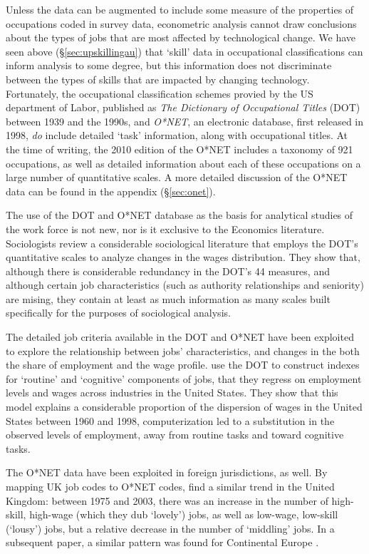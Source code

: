 Unless the data can be augmented to include some measure of the properties of occupations coded in survey data, econometric analysis cannot draw conclusions about the types of jobs that are most affected by technological change. We have seen above (\S\ref{sec:upskillingau}) that `skill' data in occupational classifications can inform analysis to some degree, but this information does not discriminate between the types of skills that are impacted by changing technology. Fortunately, the occupational classification schemes provied by the US department of Labor, published as {\em The Dictionary of Occupational Titles} (DOT) between 1939 and the 1990s, and {\em O*NET}, an electronic database, first released in 1998, {\em do} include detailed `task' information, along with occupational titles. At the time of writing, the 2010 edition of the O*NET includes a taxonomy of 921 occupations, as well as detailed information about each of these occupations on a large number of quantitative scales. A more detailed discussion of the O*NET data can be found in the appendix (\S\ref{sec:onet}).

The use of the DOT and O*NET database as the basis for analytical studies of the work force is not new, nor is it exclusive to the Economics literature. Sociologists \citet{Cain1981} review a considerable sociological literature that employs the DOT's quantitative scales to analyze changes in the wages distribution. They show that, although there is considerable redundancy in the DOT's 44 measures, and although certain job characteristics (such as authority relationships and seniority) are mising, they contain at least as much information as many scales built specifically for the purposes of sociological analysis.

The detailed job criteria available in the DOT and O*NET have been exploited to explore the relationship between jobs' characteristics, and changes in the both the share of employment and the wage profile.
\citet{Levy2003} use the DOT to construct indexes for `routine' and `cognitive' components of jobs, that they regress on employment levels and wages across industries in the United States. They show that this model explains a considerable proportion of the dispersion of wages in the United States between 1960 and 1998, computerization led to a substitution in the observed levels of employment, away from routine tasks and toward cognitive tasks. 

The O*NET data have been exploited in foreign jurisdictions, as well. By mapping UK job codes to O*NET codes, \citet{Goos2007} find a similar trend in the United Kingdom: between 1975 and 2003, there was an increase in the number of high-skill, high-wage (which they dub `lovely') jobs, as well as low-wage, low-skill (`lousy') jobs, but a relative decrease in the number of `middling' jobs. In a subsequent paper, a similar pattern was found for Continental Europe \citep{Goos2009}.


